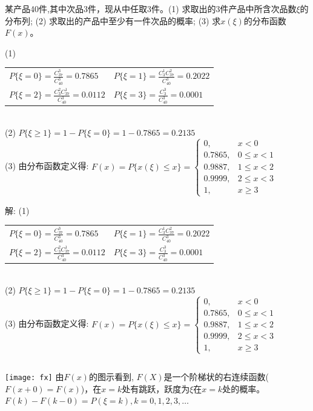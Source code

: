\begin{frame}
\begin{example}
	某产品40件,其中次品3件，现从中任取3件。(1) 求取出的3件产品中所含次品数$\xi$的分布列; (2) 求取出的产品中至少有一件次品的概率; (3) 求$x(\xi)$的分布函数$F(x)$。
	\begin{block}{}
		(1) \begin{tabular}{ll}
			$P\{\xi=0\}=\frac{C_{37}^{3}}{C_{40}^{3}}=0.7865$ & $P\{\xi=1\}=\frac{C_{3}^{1}C_{37}^{2}}{C_{40}^{3}}=0.2022$ \\ 
			$P\{\xi=2\}=\frac{C_{3}^{2}C_{37}^{1}}{C_{40}^{3}}=0.0112$ & $P\{\xi=3\}=\frac{C_{3}^{3}}{C_{40}^{3}}=0.0001$ \\ 
		\end{tabular}\\ 
	   (2) $P\{\xi\ge 1\}=1-P\{\xi=0\}=1-0.7865=0.2135$\\
	   (3) 由分布函数定义得:
	   $F(x)=P\{x(\xi)\le x\} =
	   \begin{cases}
	   	0,      & x<0 \\
	   	0.7865, & 0\le x<1 \\
	   	0.9887, & 1\le x<2 \\
	   	0.9999, & 2\le x<3 \\
	   	1,      & x\ge 3
	   \end{cases} $
	\end{block}
\end{example}
\end{frame}

\begin{frame}
\begin{block}{解:}
		(1) \begin{tabular}{ll}
			$P\{\xi=0\}=\frac{C_{37}^{3}}{C_{40}^{3}}=0.7865$ & $P\{\xi=1\}=\frac{C_{3}^{1}C_{37}^{2}}{C_{40}^{3}}=0.2022$ \\ 
			$P\{\xi=2\}=\frac{C_{3}^{2}C_{37}^{1}}{C_{40}^{3}}=0.0112$ & $P\{\xi=3\}=\frac{C_{3}^{3}}{C_{40}^{3}}=0.0001$ \\ 
		\end{tabular}\\ 
		(2) $P\{\xi\ge 1\}=1-P\{\xi=0\}=1-0.7865=0.2135$\\
		(3) 由分布函数定义得:
		$F(x)=P\{x(\xi)\le x\} =
		\begin{cases}
		0,      & x<0 \\
		0.7865, & 0\le x<1 \\
		0.9887, & 1\le x<2 \\
		0.9999, & 2\le x<3 \\
		1,      & x\ge 3
		\end{cases} $
		\begin{columns}%
			\texttt{[image: fx]}
			由$F(x)$的图示看到, $F(X)$是一个阶梯状的右连续函数($F(x+0)=F(x)$)，在$x=k$处有跳跃，跃度为$\xi$在$x=k$处的概率。\\
            $F(k)-F(k-0)=P(\xi=k), k=0,1,2,3,\dots$			
	    \end{columns}
\end{block}
\end{frame}

